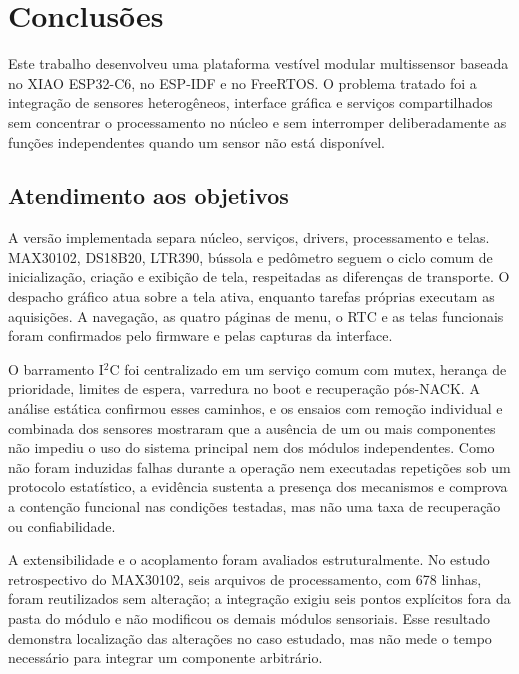 \documentclass[a4paper,12pt]{article}
\begin{document}
\section{Conclus\~oes}


Este trabalho desenvolveu uma plataforma vest\'ivel modular multissensor baseada no XIAO ESP32-C6, no ESP-IDF e no FreeRTOS. O problema tratado foi a integra\c{c}\~ao de sensores heterog\^eneos, interface gr\'afica e servi\c{c}os compartilhados sem concentrar o processamento no n\'ucleo e sem interromper deliberadamente as fun\c{c}\~oes independentes quando um sensor n\~ao est\'a dispon\'ivel.


\subsection{Atendimento aos objetivos}


A vers\~ao implementada separa n\'ucleo, servi\c{c}os, drivers, processamento e telas. MAX30102, DS18B20, LTR390, b\'ussola e ped\^ometro seguem o ciclo comum de inicializa\c{c}\~ao, cria\c{c}\~ao e exibi\c{c}\~ao de tela, respeitadas as diferen\c{c}as de transporte. O despacho gr\'afico atua sobre a tela ativa, enquanto tarefas pr\'oprias executam as aquisi\c{c}\~oes. A navega\c{c}\~ao, as quatro p\'aginas de menu, o RTC e as telas funcionais foram confirmados pelo firmware e pelas capturas da interface.


O barramento I$^2$C foi centralizado em um servi\c{c}o comum com mutex, heran\c{c}a de prioridade, limites de espera, varredura no boot e recupera\c{c}\~ao p\'os-NACK. A an\'alise est\'atica confirmou esses caminhos, e os ensaios com remo\c{c}\~ao individual e combinada dos sensores mostraram que a aus\^encia de um ou mais componentes n\~ao impediu o uso do sistema principal nem dos m\'odulos independentes. Como n\~ao foram induzidas falhas durante a opera\c{c}\~ao nem executadas repeti\c{c}\~oes sob um protocolo estat\'istico, a evid\^encia sustenta a presen\c{c}a dos mecanismos e comprova a conten\c{c}\~ao funcional nas condi\c{c}\~oes testadas, mas n\~ao uma taxa de recupera\c{c}\~ao ou confiabilidade.


A extensibilidade e o acoplamento foram avaliados estruturalmente. No estudo retrospectivo do MAX30102, seis arquivos de processamento, com 678 linhas, foram reutilizados sem altera\c{c}\~ao; a integra\c{c}\~ao exigiu seis pontos expl\'icitos fora da pasta do m\'odulo e n\~ao modificou os demais m\'odulos sensoriais. Esse resultado demonstra localiza\c{c}\~ao das altera\c{c}\~oes no caso estudado, mas n\~ao mede o tempo necess\'ario para integrar um componente arbitr\'ario.
\end{document}
